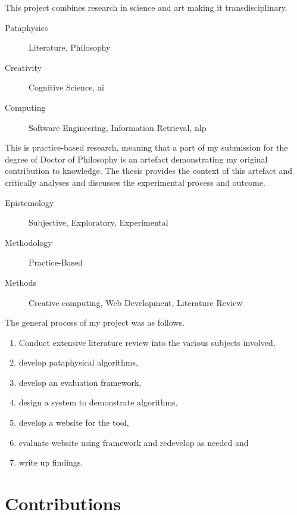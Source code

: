 This project combines research in science and art making it transdisciplinary.


\begin{description}
  \item [Pataphysics] Literature, Philosophy
  \item [Creativity] Cognitive Science, \gls{ai}
  \item [Computing] Software Engineering, Information Retrieval, \gls{nlp}
\end{description}

This is practice-based research, meaning that a part of my submission for the degree of Doctor of Philosophy is an artefact demonstrating my original contribution to knowledge. The thesis provides the context of this artefact and critically analyses and discusses the experimental process and outcome.


\begin{description}
  \item [Epistemology] Subjective, Exploratory, Experimental
  \item [Methodology] Practice-Based
  \item [Methods] Creative computing, Web Development, Literature Review
\end{description}


The general process of my project was as follows.

\begin{enumerate}
  \item Conduct extensive literature review into the various subjects involved,
  \item develop pataphysical algorithms,
  \item develop an evaluation framework,
  \item design a system to demonstrate algorithms,
  \item develop a website for the tool,
  \item evaluate website using framework and redevelop as needed and
  \item write up findings.
\end{enumerate}


\section{Contributions}

